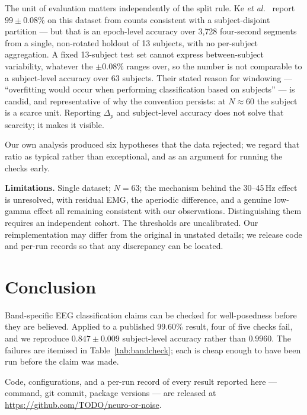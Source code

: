 \documentclass[10pt,conference]{IEEEtran}
\begin{document}
The unit of evaluation matters independently of the split rule. Ke
\emph{et al.}~\cite{ke2021} report $99\pm0.08\%$ on this dataset from counts
consistent with a subject-disjoint partition --- but that is an epoch-level
accuracy over 3{,}728 four-second segments from a single, non-rotated holdout of
13 subjects, with no per-subject aggregation. A fixed 13-subject test set cannot
express between-subject variability, whatever the $\pm0.08\%$ ranges over, so the
number is not comparable to a subject-level accuracy over 63 subjects. Their
stated reason for windowing --- ``overfitting would occur when performing
classification based on subjects'' --- is candid, and representative of why the
convention persists: at $N\approx60$ the subject is a scarce unit. Reporting
$\Delta_p$ and subject-level accuracy does not solve that scarcity; it makes it
visible.

Our own analysis produced six hypotheses that the data
rejected; we regard that ratio as typical rather than exceptional, and as an
argument for running the checks early.

\textbf{Limitations.} Single dataset; $N=63$; the mechanism behind the
30--45\,Hz effect is unresolved, with residual EMG, the aperiodic difference,
and a genuine low-gamma effect all remaining consistent with our observations.
Distinguishing them requires an independent cohort. The thresholds are
uncalibrated. Our reimplementation may differ from the original in unstated
details; we release code and per-run records so that any discrepancy can be
located.

\section{Conclusion}

Band-specific EEG classification claims can be checked for well-posedness before
they are believed. Applied to a published 99.60\% result, four of five checks
fail, and we reproduce $0.847\pm0.009$ subject-level accuracy rather than
$0.9960$. The failures are itemised in Table~\ref{tab:bandcheck}; each is cheap
enough to have been run before the claim was made.

Code, configurations, and a per-run record of every result reported here ---
command, git commit, package versions --- are released at
\url{https://github.com/TODO/neuro-or-noise}.
\end{document}

